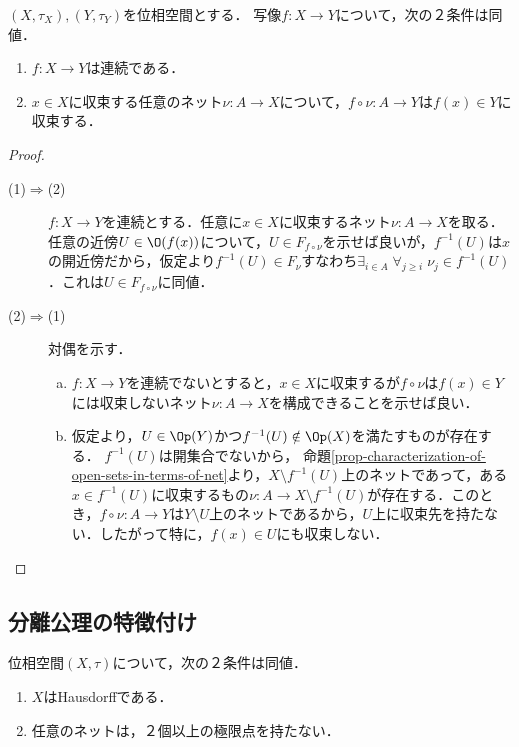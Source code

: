 \documentclass[uplatex,dvipdfmx]{jsreport}
\begin{document}
\begin{proposition}
    $(X,\tau_X),(Y,\tau_Y)$を位相空間とする．
    写像$f:X\to Y$について，次の２条件は同値．
    \begin{enumerate}
        \item $f:X\to Y$は連続である．
        \item $x\in X$に収束する任意のネット$\nu:A\to X$について，$f\circ\nu:A\to Y$は$f(x)\in Y$に収束する．
    \end{enumerate}
\end{proposition}
\begin{proof}\mbox{}
    \begin{description}
        \item[(1)$\Rightarrow$(2)] $f:X\to Y$を連続とする．任意に$x\in X$に収束するネット$\nu:A\to X$を取る．任意の近傍$U\in\O(f(x))$について，$U\in F_{f\circ\nu}$を示せば良いが，$f^{-1}(U)$は$x$の開近傍だから，仮定より$f^{-1}(U)\in F_\nu$すなわち$\exists_{i\in A}\;\forall_{j\ge i}\;\nu_j\in f^{-1}(U)$．これは$U\in F_{f\circ\nu}$に同値．
        \item[(2)$\Rightarrow$(1)] 対偶を示す．
        \begin{enumerate}[(a)]
            \item $f:X\to Y$を連続でないとすると，$x\in X$に収束するが$f\circ\nu$は$f(x)\in Y$には収束しないネット$\nu:A\to X$を構成できることを示せば良い．
            \item 仮定より，$U\in\Op(Y)$かつ$f^{-1}(U)\notin\Op(X)$を満たすものが存在する．
            $f^{-1}(U)$は開集合でないから，
            命題\ref{prop-characterization-of-open-sets-in-terms-of-net}より，$X\setminus f^{-1}(U)$上のネットであって，ある$x\in f^{-1}(U)$に収束するもの$\nu:A\to X\setminus f^{-1}(U)$が存在する．このとき，$f\circ\nu:A\to Y$は$Y\setminus U$上のネットであるから，$U$上に収束先を持たない．したがって特に，$f(x)\in U$にも収束しない．
        \end{enumerate}
    \end{description}
\end{proof}

\subsection{分離公理の特徴付け}

\begin{proposition}[(AC, EM)]
    位相空間$(X,\tau)$について，次の２条件は同値．
    \begin{enumerate}
        \item $X$はHausdorffである．
        \item 任意のネットは，２個以上の極限点を持たない．
    \end{enumerate}
\end{proposition}
\end{document}
